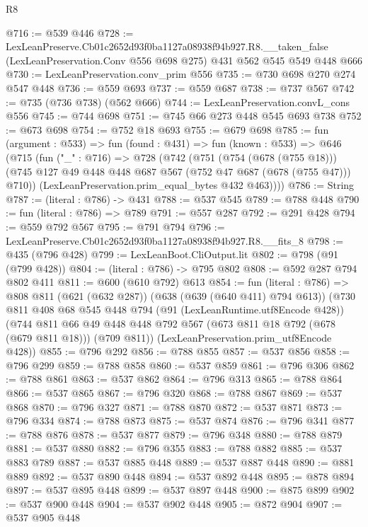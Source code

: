 \begin{lexlean}{R8}
\begin{coremodule}
@716 := @539 @446
@728 := LexLeanPreserve.Cb01c2652d93f0ba1127a08938f94b927.R8.__taken_false
    (LexLeanPreservation.Conv @556 @698 @275)
    @431
    @562
    @545
    @549
    @448
    @666
@730 := LexLeanPreservation.conv_prim @556
@735 := @730 @698 @270 @274 @547 @448
@736 := @559 @693
@737 := @559 @687
@738 := @737 @567
@742 := @735 (@736 @738) (@562 @666)
@744 := LexLeanPreservation.convL_cons @556
@745 := @744 @698
@751 := @745 @66 @273 @448 @545 @693 @738
@752 := @673 @698
@754 := @752 @18 @693
@755 := @679 @698
@785 := fun (argument : @533) =>
  fun (found : @431) =>
  fun (known : @533) =>
  @646
    (@715
      (fun ("_" : @716) =>
      @728
        (@742
          (@751
            (@754 (@678 (@755 @18)))
            (@745 @127 @49 @448 @448 @687 @567 (@752 @47 @687 (@678 (@755 @47))) @710))
          (LexLeanPreservation.prim_equal_bytes @432 @463))))
@786 := String
@787 := (literal : @786) -> @431
@788 := @537 @545
@789 := @788 @448
@790 := fun (literal : @786) => @789
@791 := @557 @287
@792 := @291 @428
@794 := @559 @792 @567
@795 := @791 @794
@796 := LexLeanPreserve.Cb01c2652d93f0ba1127a08938f94b927.R8.__fits_8
@798 := @435 (@796 @428)
@799 := LexLeanBoot.CliOutput.lit
@802 := @798 (@91 (@799 @428))
@804 := (literal : @786) -> @795 @802
@808 := @592 @287 @794 @802 @411
@811 := @600 (@610 @792) @613
@854 := fun (literal : @786) =>
  @808
    @811
    (@621 (@632 @287))
    (@638 (@639 (@640 @411) @794 @613))
    (@730
      @811
      @408
      @68
      @545
      @448
      @794
      (@91 (LexLeanRuntime.utf8Encode @428))
      (@744
        @811
        @66
        @49
        @448
        @448
        @792
        @567
        (@673 @811 @18 @792 (@678 (@679 @811 @18)))
        (@709 @811))
      (LexLeanPreservation.prim_utf8Encode @428))
@855 := @796 @292
@856 := @788 @855
@857 := @537 @856
@858 := @796 @299
@859 := @788 @858
@860 := @537 @859
@861 := @796 @306
@862 := @788 @861
@863 := @537 @862
@864 := @796 @313
@865 := @788 @864
@866 := @537 @865
@867 := @796 @320
@868 := @788 @867
@869 := @537 @868
@870 := @796 @327
@871 := @788 @870
@872 := @537 @871
@873 := @796 @334
@874 := @788 @873
@875 := @537 @874
@876 := @796 @341
@877 := @788 @876
@878 := @537 @877
@879 := @796 @348
@880 := @788 @879
@881 := @537 @880
@882 := @796 @355
@883 := @788 @882
@885 := @537 @883 @789
@887 := @537 @885 @448
@889 := @537 @887 @448
@890 := @881 @889
@892 := @537 @890 @448
@894 := @537 @892 @448
@895 := @878 @894
@897 := @537 @895 @448
@899 := @537 @897 @448
@900 := @875 @899
@902 := @537 @900 @448
@904 := @537 @902 @448
@905 := @872 @904
@907 := @537 @905 @448

\end{coremodule}
\end{lexlean}
